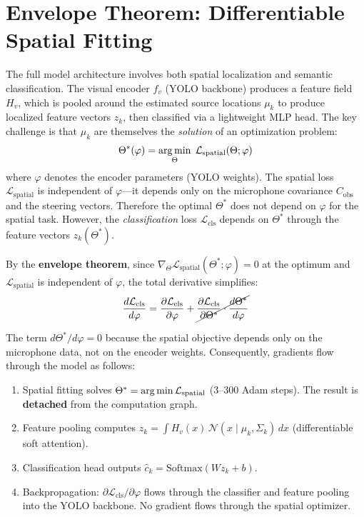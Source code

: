\documentclass{article}
\begin{document}
\section{Envelope Theorem: Differentiable Spatial Fitting}
\label{sec:envelope}

The full model architecture involves both spatial localization and semantic classification. The visual encoder $f_v$ (YOLO backbone) produces a feature field $H_v$, which is pooled around the estimated source locations $\mu_k$ to produce localized feature vectors $z_k$, then classified via a lightweight MLP head. The key challenge is that $\mu_k$ are themselves the \emph{solution} of an optimization problem:
\begin{equation}
\Theta^*(\varphi) = \operatorname*{arg\,min}_{\Theta}\; \mathcal{L}_{\text{spatial}}(\Theta; \varphi)
\end{equation}
where $\varphi$ denotes the encoder parameters (YOLO weights). The spatial loss $\mathcal{L}_{\text{spatial}}$ is independent of $\varphi$---it depends only on the microphone covariance $C_{\text{obs}}$ and the steering vectors. Therefore the optimal $\Theta^*$ does not depend on $\varphi$ for the spatial task. However, the \emph{classification} loss $\mathcal{L}_{\text{cls}}$ depends on $\Theta^*$ through the feature vectors $z_k(\Theta^*)$.

By the \textbf{envelope theorem}, since $\nabla_\Theta \mathcal{L}_{\text{spatial}}(\Theta^*; \varphi) = 0$ at the optimum and $\mathcal{L}_{\text{spatial}}$ is independent of $\varphi$, the total derivative simplifies:
\begin{equation}
\frac{d\mathcal{L}_{\text{cls}}}{d\varphi} = \frac{\partial\mathcal{L}_{\text{cls}}}{\partial\varphi}
      + \cancel{\frac{\partial\mathcal{L}_{\text{cls}}}{\partial\Theta^*} \cdot \frac{d\Theta^*}{d\varphi}}
\end{equation}

The term $d\Theta^*/d\varphi = 0$ because the spatial objective depends only on the microphone data, not on the encoder weights. Consequently, gradients flow through the model as follows:
\begin{enumerate}[label={(\arabic*)}]
    \item Spatial fitting solves $\Theta^* = \operatorname*{arg\,min} \mathcal{L}_{\text{spatial}}$ (3--300 Adam steps). The result is \textbf{detached} from the computation graph.
    \item Feature pooling computes $z_k = \int H_v(x)\,\mathcal{N}(x \mid \mu_k, \Sigma_k)\,dx$ (differentiable soft attention).
    \item Classification head outputs $\hat{c}_k = \text{Softmax}(W z_k + b)$.
    \item Backpropagation: $\partial\mathcal{L}_{\text{cls}} / \partial \varphi$ flows through the classifier and feature pooling into the YOLO backbone. No gradient flows through the spatial optimizer.
\end{enumerate}
\end{document}
